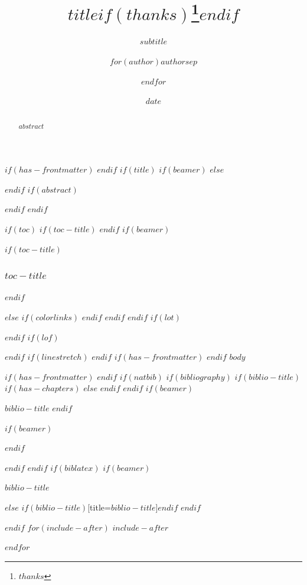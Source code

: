 \documentclass[
$if(fontsize)$
  $fontsize$,
$endif$
$if(lang)$
  $babel-lang$,
$endif$
$if(papersize)$
  $papersize$paper,
$endif$
$if(beamer)$
  ignorenonframetext,
$if(handout)$
  handout,
$endif$
$if(aspectratio)$
  aspectratio=$aspectratio$,
$endif$
$endif$
$for(classoption)$
  $classoption$$sep$,
$endfor$
]{$documentclass$}
\title[$title_short$]{$title$$if(thanks)$\thanks{$thanks$}$endif$}
\subtitle{$subtitle$}
\author[$author_short$]{$for(author)$$author$$sep$ \and $endfor$}
\date{$date$}
\institute{$for(institute)$$institute$$sep$ \and $endfor$}
\newif\ifbibliography
\begin{document}
$if(has-frontmatter)$
\frontmatter
$endif$
$if(title)$
$if(beamer)$
\frame[plain]{\titlepage}
$else$
\maketitle
$endif$
$if(abstract)$
\begin{abstract}
$abstract$
\end{abstract}
$endif$
$endif$


$if(toc)$
$if(toc-title)$
\renewcommand*\contentsname{$toc-title$}
$endif$
$if(beamer)$
\begin{frame}[allowframebreaks]
$if(toc-title)$
  \frametitle{$toc-title$}
$endif$
  \tableofcontents[hideallsubsections]
\end{frame}
$else$
{
$if(colorlinks)$
\hypersetup{linkcolor=$if(toccolor)$$toccolor$$else$$endif$}
$endif$
\setcounter{tocdepth}{$toc-depth$}
\tableofcontents
}
$endif$
$endif$
$if(lot)$
\listoftables
$endif$
$if(lof)$
\listoffigures
$endif$
$if(linestretch)$
$endif$
$if(has-frontmatter)$
\mainmatter
$endif$
$body$

$if(has-frontmatter)$
\backmatter
$endif$
$if(natbib)$
$if(bibliography)$
$if(biblio-title)$
$if(has-chapters)$
\renewcommand\bibname{$biblio-title$}
$else$
\renewcommand\refname{$biblio-title$}
$endif$
$endif$
$if(beamer)$
\begin{frame}[allowframebreaks]{$biblio-title$}
  \bibliographytrue
$endif$
  
$if(beamer)$
\end{frame}
$endif$

$endif$
$endif$
$if(biblatex)$
$if(beamer)$
\begin{frame}[allowframebreaks]{$biblio-title$}
  \bibliographytrue
  \printbibliography[heading=none]
\end{frame}
$else$
\printbibliography$if(biblio-title)$[title=$biblio-title$]$endif$
$endif$

$endif$
$for(include-after)$
$include-after$

$endfor$
\end{document}
